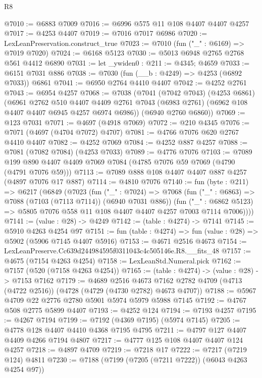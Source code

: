 \begin{lexlean}{R8}
\begin{coremodule}
@7010 := @6883 @7009
@7016 := @6996 @575 @11 @108 @4407 @4407 @4257
@7017 := @4253 @4407
@7019 := @7016 @7017 @6986
@7020 := LexLeanPreservation.construct_true
@7023 := @7010 (fun ("_" : @6169) => @7019 @7020)
@7024 := @6168 @5123
@7030 := @5013 @6948 @2765 @2768 @561 @4412 @6890
@7031 := let _ywiden0 : @211 := @4345; @4659
@7033 := @6151 @7031 @886
@7038 := @7030 (fun (__b : @4249) => @4253 (@6892 @7033)) @6861
@7041 := @6950 @2764 @4410 @4407
@7042 := @4252 @2761
@7043 := @6954 @4257
@7068 := @7038
    (@7041
      (@7042 @7043)
      (@4253 @6861)
      (@6961
        @2762
        @510
        @4407
        @4409
        @2761
        @7043
        (@6983 @2761)
        (@6962 @108 @4407 @4407 @6945 @4257 @6974 @6986))
      (@6940 @2760 @6860))
@7069 := @123 @7031
@7071 := @4697 (@4918 @7069)
@7072 := @210 @4345
@7076 := @7071 (@4697 (@4704 @7072) @4707)
@7081 := @4766 @7076 @620 @2767 @4410 @4407
@7082 := @4252 @7069
@7084 := @4252 @887 @4257
@7088 := @7081 (@7082 @7084) (@4253 @7033)
@7089 := @4776 @7076
@7103 := @7089 @199 @890 @4407 @4409 @7069 @7084 (@4785 @7076 @59 @7069 (@4790 (@4791 @7076 @59)))
@7113 := @7089 @888 @108 @4407 @4407 @887 @4257 (@4897 @7076 @17 @887)
@7114 := @4810 @7076
@7140 := fun (byte : @211) =>
  @6217
    (@6849
      (@7023
        (fun ("_" : @7024) =>
        @7068
          (fun ("_" : @6863) => @7088 (@7103 (@7113 @7114)) (@6940 @7031 @886))
          (fun ("_" : @6862 @5123) =>
          @5805 @7076 @558 @11 @108 @4407 @4407 @4257 @7003 @7114 @7006))))
@7141 := (value : @28) -> @4249
@7142 := (table : @4274) -> @7141
@7145 := @5910 @4263 @4254 @97
@7151 := fun (table : @4274) => fun (value : @28) => @5902 (@5906 @7145 @4407 @5916)
@7153 := @4671 @2516 @4673
@7154 := LexLeanPreserve.Cc639d244984595f0311043c4c505146e.R8.__fits_48
@7157 := @4675 (@7154 @4263 @4254)
@7158 := LexLeanStd.Numeral.pick
@7162 := @7157 (@520 (@7158 @4263 @4254))
@7165 := (table : @4274) -> (value : @28) -> @7153 @7162
@7179 := @4689
    @2516
    @4673
    @7162
    @2782
    @4709
    (@4713 (@4722 @2516))
    (@4728 (@4729 (@4730 @2782) @4673 @4707))
@7188 := @5967 @4709 @22 @2776 @2780 @5901 @5974 @5979 @5988 @7145
@7192 := @4767 @508 @2775 @5899 @4407
@7193 := @4252 @124
@7194 := @7193 @4257
@7195 := @4267 @7194
@7199 := @7192 (@4369 @7195) (@5974 @7145)
@7205 := @4778 @128 @4407 @4410 @4368 @7195 @4795
@7211 := @4797 @127 @4407 @4409 @4266 @7194 @4807
@7217 := @4777 @125 @108 @4407 @4407 @124 @4257
@7218 := @4897 @4709
@7219 := @7218 @17
@7222 := @7217 (@7219 @124) @4811
@7230 := @7188 (@7199 (@7205 (@7211 @7222)) (@6043 @4263 @4254 @97))

\end{coremodule}
\end{lexlean}
